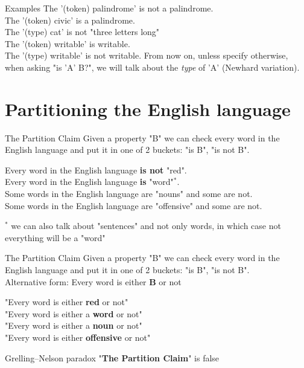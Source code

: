 \begin{frame}{Examples}
	\pause
	The '(token) palindrome' is not a palindrome.\pause\\
	The '(token) civic' is a palindrome.\pause\\
	The '(type) cat' is not "three letters long"\pause\\
	The '(token) writable' is writable.\pause\\
	The '(type) writable' is not writable.\pause\newline\newline
	From now on, unless specify otherwise, when asking "is 'A' B?", we will talk about the \textit{type} of 'A' (Newhard variation).
\end{frame}

\section[Bucketing]{Partitioning the English language}
\begin{frame}
	\begin{block}{The Partition Claim}
		Given a property "B" we can check every word in the English language and put it in one of 2 buckets: "is B", "is not B".
	\end{block}\pause
	Every word in the English language \textbf{is not} "red".\pause\\
	Every word in the English language \textbf{is} "word"$^*$.\pause\\
	Some words in the English language are "nouns" and some are not.\pause\\
	Some words in the English language are "offensive" and some are not.\pause\newline\newline\newline
	
	$^*$ {\small{we can also talk about "sentences" and not only words, in which case not everything will be a "word"}}
\end{frame}

\begin{frame}
	\begin{block}{The Partition Claim}
		Given a property "B" we can check every word in the English language and put it in one of 2 buckets: "is B", "is not B".\\
		Alternative form: Every word is either \textbf{B} or not
	\end{block}\pause
	"Every word is either \textbf{red} or not"\pause\\
	"Every word is either a \textbf{word} or not"\pause\\
	"Every word is either a \textbf{noun} or not"\pause\\
	"Every word is either \textbf{offensive} or not"\pause
	\begin{block}{Grelling–Nelson paradox}
 		"\textbf{The Partition Claim}" is false
	\end{block}
\end{frame}

